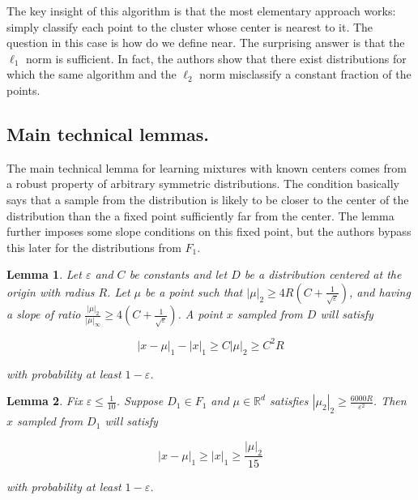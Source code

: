 \documentclass[11pt,letter]{article}
\newtheorem{lemma}{Lemma}
\begin{document}
The key insight of this algorithm is that the most elementary approach works: simply classify each point to the cluster whose center is nearest to it. The question in this case is how do we define near. The surprising answer is that the $\ell_1$ norm is sufficient. In fact, the authors show that there exist distributions for which the same algorithm and the $\ell_2$ norm misclassify a constant fraction of the points. 

\subsection{Main technical lemmas.}

The main technical lemma for learning mixtures with known centers comes from a robust property of arbitrary symmetric distributions. The condition basically says that a sample from the distribution is likely to be closer to the center of the distribution than the a fixed point sufficiently far from the center. The lemma further imposes some slope conditions on this fixed point, but the authors bypass this later for the distributions from $F_1$. 

\begin{lemma}
Let $\varepsilon$ and $C$ be constants and let $D$ be a distribution centered at the origin with radius $R$. Let $\mu$ be a point such that $|\mu|_2 \geq 4R(C+\frac{1}{\sqrt{\varepsilon}})$, and having a slope of ratio $\frac{|\mu|_2}{|\mu|_\infty} \geq 4(C+\frac{1}{\sqrt{\varepsilon}})$. A point $x$ sampled from $D$ will satisfy 

\begin{equation*}
|x-\mu|_1 - |x|_1 \geq C|\mu|_2 \geq C^2R 
\end{equation*}

with probability at least $1-\varepsilon$. 
 
\end{lemma} 

\begin{lemma}
Fix $\varepsilon \leq \frac{1}{10}$. Suppose $D_1 \in F_1$ and $\mu \in \mathbb{R}^d$ satisfies $|\mu_2|_2 \geq \frac{6000R}{\varepsilon^2}$. Then $x$ sampled from $D_1$ will satisfy 

$$|x - \mu|_1 \geq |x|_1 \geq \frac{|\mu|_2}{15}$$

with probability at least $1-\varepsilon$. 
\end{lemma} 

 
 
\end{document}
